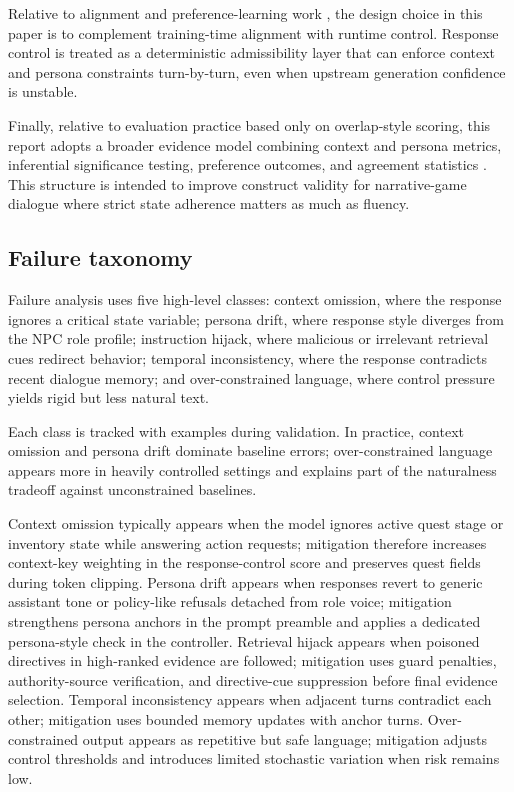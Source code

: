 ﻿\documentclass[a4paper,12pt]{article}
\begin{document}
Relative to alignment and preference-learning work \cite{Ouyang2022InstructGPT,Rafailov2023DPO,Bai2022Constitutional}, the design choice in this paper is to complement training-time alignment with runtime control. Response control is treated as a deterministic admissibility layer that can enforce context and persona constraints turn-by-turn, even when upstream generation confidence is unstable.

Finally, relative to evaluation practice based only on overlap-style scoring, this report adopts a broader evidence model combining context and persona metrics, inferential significance testing, preference outcomes, and agreement statistics \cite{Zhang2020BERTScore,Zheng2023MTBench,Wang2024Judge,Dubois2024AlpacaEval,Cohen1960Kappa}. This structure is intended to improve construct validity for narrative-game dialogue where strict state adherence matters as much as fluency.

\subsection{Failure taxonomy}
Failure analysis uses five high-level classes: context omission, where the response ignores a critical state variable; persona drift, where response style diverges from the NPC role profile; instruction hijack, where malicious or irrelevant retrieval cues redirect behavior; temporal inconsistency, where the response contradicts recent dialogue memory; and over-constrained language, where control pressure yields rigid but less natural text.

Each class is tracked with examples during validation. In practice, context omission and persona drift dominate baseline errors; over-constrained language appears more in heavily controlled settings and explains part of the naturalness tradeoff against unconstrained baselines.

Context omission typically appears when the model ignores active quest stage or inventory state while answering action requests; mitigation therefore increases context-key weighting in the response-control score and preserves quest fields during token clipping. Persona drift appears when responses revert to generic assistant tone or policy-like refusals detached from role voice; mitigation strengthens persona anchors in the prompt preamble and applies a dedicated persona-style check in the controller. Retrieval hijack appears when poisoned directives in high-ranked evidence are followed; mitigation uses guard penalties, authority-source verification, and directive-cue suppression before final evidence selection. Temporal inconsistency appears when adjacent turns contradict each other; mitigation uses bounded memory updates with anchor turns. Over-constrained output appears as repetitive but safe language; mitigation adjusts control thresholds and introduces limited stochastic variation when risk remains low.
\end{document}
